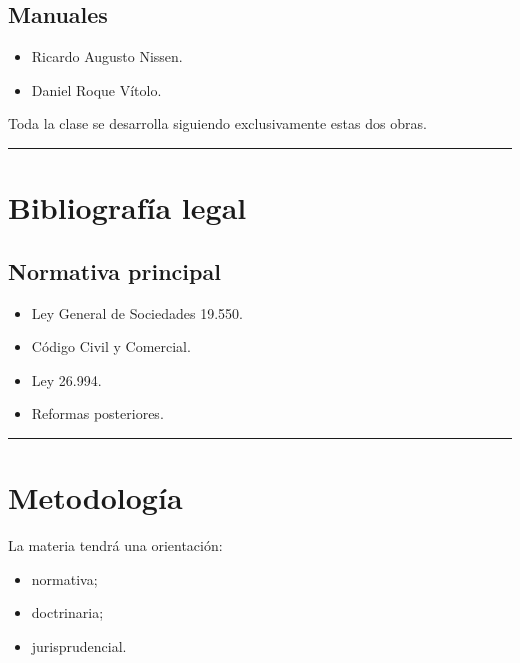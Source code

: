 \documentclass[
  spanish,
  letterpaper,
  DIV=11,
  numbers=noendperiod]{scrartcl}
\providecommand{\tightlist}{%
  \setlength{\itemsep}{0pt}\setlength{\parskip}{0pt}}
\begin{document}
\subsection{Manuales}\label{manuales}

\begin{itemize}
\tightlist
\item
  Ricardo Augusto Nissen.
\item
  Daniel Roque Vítolo.
\end{itemize}

Toda la clase se desarrolla siguiendo exclusivamente estas dos obras.

\begin{center}\rule{0.5\linewidth}{0.5pt}\end{center}

\section{Bibliografía legal}\label{bibliografuxeda-legal}

\subsection{Normativa principal}\label{normativa-principal}

\begin{itemize}
\tightlist
\item
  Ley General de Sociedades 19.550.
\item
  Código Civil y Comercial.
\item
  Ley 26.994.
\item
  Reformas posteriores.
\end{itemize}

\begin{center}\rule{0.5\linewidth}{0.5pt}\end{center}

\section{Metodología}\label{metodologuxeda}

La materia tendrá una orientación:

\begin{itemize}
\tightlist
\item
  normativa;
\item
  doctrinaria;
\item
  jurisprudencial.
\end{itemize}
\end{document}
